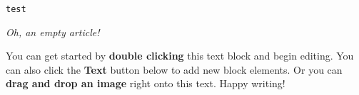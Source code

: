 \begin{lstlisting}[frame=single]  % Start your code-block
test
\end{lstlisting}



\textit{Oh, an empty article!} 

You can get started by \textbf{double clicking} this text block and begin editing. You can also click the \textbf{Text} button below to add new block elements. Or you can \textbf{drag and drop an image} right onto this text. Happy writing!